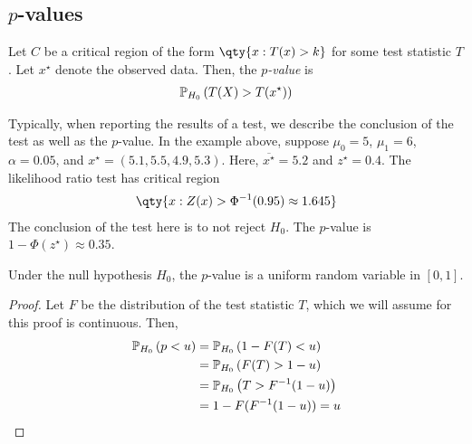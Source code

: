 \subsection{\texorpdfstring{$p$}{p}-values}
\begin{definition}
	Let $C$ be a critical region of the form $\qty{ x: T(x) > k }$ for some test statistic $T$.
	Let $x^\star$ denote the observed data.
	Then, the \textit{$p$-value} is
	\begin{align*}
		\mathbb{P}_{H_0}\left({T(X) > T(x^\star)}\right)
	\end{align*}
\end{definition}
Typically, when reporting the results of a test, we describe the conclusion of the test as well as the $p$-value.
In the example above, suppose $\mu_0 = 5$, $\mu_1 = 6$, $\alpha = 0.05$, and $x^\star = (5.1, 5.5, 4.9, 5.3)$.
Here, $\overline{x^\star} = 5.2$ and $z^\star = 0.4$.
The likelihood ratio test has critical region
\begin{align*}
	\qty{x: Z(x) > \Phi^{-1}(0.95) \approx 1.645}
\end{align*}
The conclusion of the test here is to not reject $H_0$.
The $p$-value is $1 - \Phi(z^\star) \approx 0.35$.
\begin{proposition}
	Under the null hypothesis $H_0$, the $p$-value is a uniform random variable in $[0,1]$.
\end{proposition}
\begin{proof}
	Let $F$ be the distribution of the test statistic $T$, which we will assume for this proof is continuous.
	Then,
	\begin{align*}
		\mathbb{P}_{H_0}\left({p < u}\right) & = \mathbb{P}_{H_0}\left({1 - F(T) < u}\right)    \\
		                  & = \mathbb{P}_{H_0}\left({F(T) > 1-u}\right)      \\
		                  & = \mathbb{P}_{H_0}\left({T > F^{-1}(1-u)}\right) \\
		                  & = 1 - F(F^{-1}(1-u)) = u
	\end{align*}
\end{proof}

